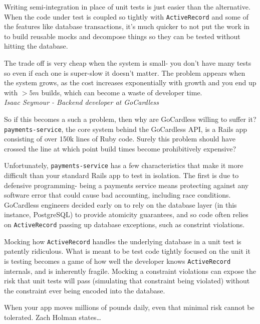 \documentclass[11pt]{article}
\begin{document}
\begin{displayquote}

  Writing semi-integration in place of unit tests is just easier than the
  alternative. When the code under test is coupled so tightly with
  \texttt{ActiveRecord} and some of the features like database transactions,
  it's much quicker to not put the work in to build reusable mocks and decompose
  things so they can be tested without hitting the database.

  The trade off is very cheap when the system is small- you don't have many
  tests so even if each one is super-slow it doesn't matter. The problem appears
  when the system grows, as the cost increases exponentially with growth and you
  end up with $>5m$ builds, which can become a waste of developer time. \\

  \textit{Isaac Seymour - Backend developer at GoCardless}

\end{displayquote}

So if this becomes a such a problem, then why are GoCardless willing to suffer it?
\texttt{payments-service}, the core system behind the GoCardless API, is a Rails app
consisting of over 150k lines of Ruby code. Surely this problem should have
crossed the line at which point build times become prohibitively expensive?

Unfortunately, \texttt{payments-service} has a few characteristics that make it
more difficult than your standard Rails app to test in isolation. The first is
due to defensive programming- being a payments service means protecting against
any software error that could cause bad accounting, including race conditions.
GoCardless engineers decided early on to rely on the database layer (in this
instance, PostgreSQL) to provide atomicity guarantees, and so code often relies
on \texttt{ActiveRecord} passing up database exceptions, such as constrint
violations.

Mocking how \texttt{ActiveRecord} handles the underlying database in a unit test
is patently ridiculous. What is meant to be test code tightly focused on the
unit it is testing becomes a game of how well the developer knows
\texttt{ActiveRecord} internals, and is inherently fragile. Mocking a
constraint violations can expose the risk that unit tests will pass (simulating
that constraint being violated) without the constraint ever being encoded into
the database.

When your app moves millions of pounds daily, even that minimal risk cannot be
tolerated. Zach Holman states\dots
\end{document}
